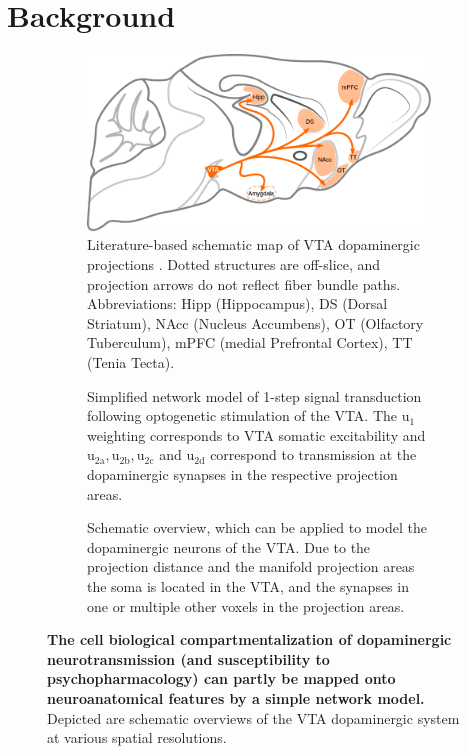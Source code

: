 \section{Background}

\begin{figure}[h!]
	\centering
	\hspace*{\fill}
	\begin{subfigure}{.527\textwidth}
		\centering
		\includegraphics[width=\textwidth]{img/model_literature}
		\caption{
			Literature-based schematic map of VTA dopaminergic projections \cite{Aransay2015,Fields2007,Ikemoto2007,Hnasko2012,Pan2010}.
			Dotted structures are off-slice, and projection arrows do not reflect fiber bundle paths.
			Abbreviations: Hipp (Hippocampus), DS (Dorsal Striatum), NAcc (Nucleus Accumbens), OT (Olfactory Tuberculum), mPFC (medial Prefrontal Cortex), TT (Tenia Tecta).
			}
		\label{fig:ml}
	\end{subfigure}\hfill
	\begin{subfigure}{.44\textwidth}
		\centering
		\vspace{-1em}
		\vspace{-0.8em}
		\caption{
			Simplified network model of 1-step signal transduction following optogenetic stimulation of the VTA.
			The $\mathrm{u_1}$ weighting corresponds to VTA somatic excitability and $\mathrm{u_{2a},u_{2b},u_{2c}}$ and $\mathrm{u_{2d}}$ correspond to transmission at the dopaminergic synapses in the respective projection areas.
			}
		\label{fig:md}
	\end{subfigure}
	\hspace*{\fill}
	\begin{subfigure}{.985\textwidth}
		\centering
		\caption{
			Schematic overview, which can be applied to model the dopaminergic neurons of the VTA.
			Due to the projection distance and the manifold projection areas the soma is located in the VTA, and the synapses in one or multiple other voxels in the projection areas.
			}
		\label{fig:nm}
	\end{subfigure}
	\caption{
		\textbf{The cell biological compartmentalization of dopaminergic neurotransmission (and susceptibility to psychopharmacology) can partly be mapped onto neuroanatomical features by a simple network model.}
		Depicted are schematic overviews of the VTA dopaminergic system at various spatial resolutions.
		}
	\label{fig:m}
\end{figure}

